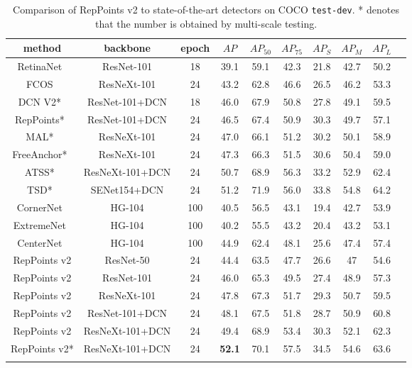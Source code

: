\documentclass{article}
\begin{document}
\begin{table}
  \caption{Comparison of RepPoints v2 to state-of-the-art detectors on COCO \texttt{test-dev}. * denotes that the number is obtained by multi-scale testing.}
  \small
  \label{tab:sota}
  \centering
  \begin{tabular}{c|cc|ccccccc}
    \Xhline{1.0pt}
     method & backbone & epoch & $AP$ & $AP_{50}$ & $AP_{75}$ & $AP_{S}$ & $AP_{M}$ & $AP_{L}$\\
    \hline
    RetinaNet~\cite{RetinaNet} & ResNet-101 & 18 & 39.1 & 59.1 & 42.3 & 21.8 & 42.7 & 50.2 \\
    FCOS~\cite{tian2019fcos} & ResNeXt-101 & 24 & 43.2 & 62.8 & 46.6 & 26.5 & 46.2 & 53.3\\
    DCN V2*~\cite{zhu19deformv2} & ResNet-101+DCN & 18 & 46.0 & 67.9 & 50.8 & 27.8 & 49.1 & 59.5\\
    RepPoints*~\cite{yang19reppts} & ResNet-101+DCN & 24 & 46.5 & 67.4 & 50.9 & 30.3 & 49.7 & 57.1\\
    MAL*~\cite{wei20mal}& ResNeXt-101 & 24 & 47.0 & 66.1 & 51.2 & 30.2 & 50.1 & 58.9\\
    FreeAnchor*~\cite{zhang19freeanchor}& ResNeXt-101 & 24 & 47.3 & 66.3 & 51.5 & 30.6 & 50.4 & 59.0\\
    ATSS*~\cite{zhang2019atss} & ResNeXt-101+DCN & 24 & 50.7 & 68.9 & 56.3 & 33.2 & 52.9 & 62.4\\
    TSD*~\cite{song20tsd}& SENet154+DCN & 24 & 51.2 & 71.9 & 56.0 & 33.8 & 54.8 & 64.2\\
    \hline
    CornerNet~\cite{CornerNet} & HG-104 & 100 & 40.5 & 56.5 & 43.1 & 19.4 & 42.7 & 53.9\\
    ExtremeNet~\cite{ExtremeNet} & HG-104 & 100 & 40.2 & 55.5 & 43.2 & 20.4 & 43.2 & 53.1\\
    CenterNet~\cite{duan19center} & HG-104 & 100 & 44.9 & 62.4 & 48.1 & 25.6 & 47.4 & 57.4\\
    \hline
    RepPoints v2 & ResNet-50 & 24 & 44.4 & 63.5 & 47.7 & 26.6 & 47 & 54.6\\
    RepPoints v2 & ResNet-101 & 24 & 46.0 & 65.3 & 49.5 & 27.4 & 48.9 & 57.3\\
    RepPoints v2 & ResNeXt-101 & 24 & 47.8 & 67.3 & 51.7 & 29.3 & 50.7 & 59.5\\
    RepPoints v2 & ResNet-101+DCN & 24 & 48.1 & 67.5 & 51.8 & 28.7 & 50.9 & 60.8\\
    RepPoints v2 & ResNeXt-101+DCN & 24 & 49.4 & 68.9 & 53.4 & 30.3 & 52.1 & 62.3\\
    RepPoints v2* & ResNeXt-101+DCN & 24 & \textbf{52.1} & 70.1 & 57.5 & 34.5 & 54.6 & 63.6\\
    \Xhline{1.0pt}
  \end{tabular}
\end{table}
\end{document}
